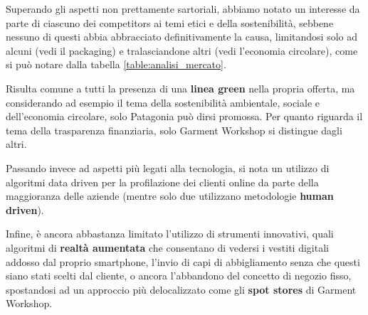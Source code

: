 \documentclass[12pt]{article}
\begin{document}
Superando gli aspetti non prettamente sartoriali, abbiamo notato un interesse da parte di ciascuno dei competitors ai temi etici e della sostenibilità, sebbene nessuno di questi abbia abbracciato definitivamente la causa, limitandosi solo ad alcuni (vedi il packaging) e tralasciandone altri (vedi l'economia circolare), come si può notare dalla tabella \ref{table:analisi_mercato}.

Risulta comune a tutti la presenza di una \textbf{linea green} nella propria offerta, ma considerando ad esempio il tema della sostenibilità ambientale, sociale e dell'economia circolare, solo Patagonia può dirsi promossa. Per quanto riguarda il tema della trasparenza finanziaria, solo Garment Workshop si distingue dagli altri.

Passando invece ad aspetti più legati alla tecnologia, si nota un utilizzo di algoritmi data driven per la profilazione dei clienti online da parte della maggioranza delle aziende (mentre solo due utilizzano metodologie \textbf{human driven}).

Infine, è ancora abbastanza limitato l'utilizzo di strumenti innovativi, quali algoritmi di \textbf{realtà aumentata} che consentano di vedersi i vestiti digitali addosso dal proprio smartphone, l'invio di capi di abbigliamento senza che questi siano stati scelti dal cliente, o ancora l'abbandono del concetto di negozio fisso, spostandosi ad un approccio più delocalizzato come gli \textbf{spot stores} di Garment Workshop.
\end{document}
